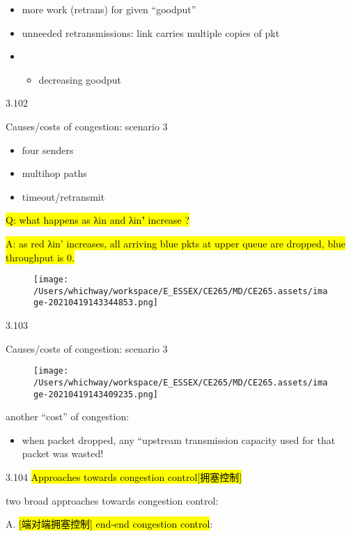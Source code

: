 \documentclass[
]{article}
\begin{document}
\begin{itemize}
\item
  more work (retrans) for given ``goodput''
\item
  unneeded retransmissions: link carries multiple copies of pkt
\item
  \begin{itemize}
  \item
    decreasing goodput
  \end{itemize}
\end{itemize}

3.102

Causes/costs of congestion: scenario 3

\begin{itemize}
\item
  four senders
\item
  multihop paths
\item
  timeout/retransmit
\end{itemize}

\hl{Q: what happens as λin and λin\textbf{'} increase ?}

\hl{A: as red λin' increases, all arriving blue pkts at upper queue are
dropped, blue throughput is 0.}

\begin{figure}
\centering
\texttt{[image: /Users/whichway/workspace/E\_ESSEX/CE265/MD/CE265.assets/image-20210419143344853.png]}
\caption{}
\end{figure}

3.103

Causes/costs of congestion: scenario 3

\begin{figure}
\centering
\texttt{[image: /Users/whichway/workspace/E\_ESSEX/CE265/MD/CE265.assets/image-20210419143409235.png]}
\caption{}
\end{figure}

another ``cost'' of congestion:

\begin{itemize}
\item
  when packet dropped, any ``upstream transmission capacity used for
  that packet was wasted!
\end{itemize}

3.104 \hl{Approaches towards congestion control{[}拥塞控制{]}}

two broad approaches towards congestion control:

A. \hl{{[}端对端拥塞控制{]} end-end congestion control}:
\end{document}
